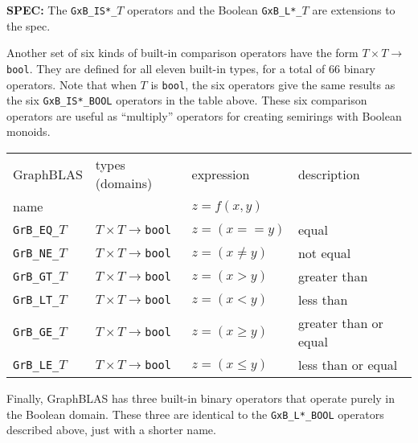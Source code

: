 \documentclass[12pt]{article}
\begin{document}
\begin{spec}
{\bf SPEC:} The \verb'GxB_IS*_'$T$ operators and the Boolean \verb'GxB_L*_'$T$ are extensions to the spec.
\end{spec}

Another set of six kinds of built-in comparison operators have the form $T
\times T \rightarrow $\verb'bool'.  They are defined for all eleven built-in
types, for a total of 66 binary operators.  Note that when $T$ is \verb'bool',
the six operators give the same results as the six \verb'GxB_IS*_BOOL'
operators in the table above.  These six comparison operators are useful as
``multiply'' operators for creating semirings with Boolean monoids.

\vspace{0.2in}
{\footnotesize
\begin{tabular}{llll}
\hline
GraphBLAS             & types (domains)            & expression      & description \\
name                  &                            & $z=f(x,y)$      & \\
\hline
\verb'GrB_EQ_'$T$     & $T \times T \rightarrow $\verb'bool' & $z = (x == y)$  & equal \\
\verb'GrB_NE_'$T$     & $T \times T \rightarrow $\verb'bool' & $z = (x \ne y)$ & not equal \\
\verb'GrB_GT_'$T$     & $T \times T \rightarrow $\verb'bool' & $z = (x >   y)$ & greater than \\
\verb'GrB_LT_'$T$     & $T \times T \rightarrow $\verb'bool' & $z = (x <   y)$ & less than  \\
\verb'GrB_GE_'$T$     & $T \times T \rightarrow $\verb'bool' & $z = (x \ge y)$ & greater than or equal \\
\verb'GrB_LE_'$T$     & $T \times T \rightarrow $\verb'bool' & $z = (x \le y)$ & less than or equal  \\
\hline
\end{tabular}
}
\vspace{0.2in}

Finally, GraphBLAS has three built-in binary operators that operate purely in
the Boolean domain.  These three are identical to the \verb'GxB_L*_BOOL'
operators described above, just with a shorter name.
\end{document}

